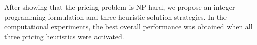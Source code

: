 \documentclass[preprint, 11pt, authoryear]{elsarticle}
\newcommand{\PP}{{\mathcal P}}
\newcommand{\card}[1]{\left| #1 \right|}
\newcommand{\pricingform}{\text{DPCP-PRI}}
\begin{document}
After showing that the pricing problem is NP-hard, 
we propose an integer programming formulation and three heuristic solution strategies. 
In the computational experiments, the best overall performance was obtained when all three pricing heuristics were activated. 



\end{document}
